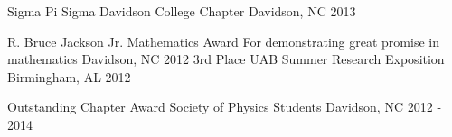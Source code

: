 \begin{cvhonors}
  \cvhonor
    {Sigma Pi Sigma} %
    {Davidson College Chapter} %
    {Davidson, NC} %
    {2013} %

  \cvhonor
    {R. Bruce Jackson Jr. Mathematics Award} %
    {For demonstrating great promise in mathematics} %
    {Davidson, NC} %
    {2012} %
%
  \cvhonor
    {3rd Place} %
    {UAB Summer Research Exposition} %
    {Birmingham, AL} %
    {2012} %

  \cvhonor
    {Outstanding Chapter Award} %
    {Society of Physics Students} %
    {Davidson, NC} %
    {2012 - 2014} %

\end{cvhonors}




%
%
%
%
%
%
%
%
